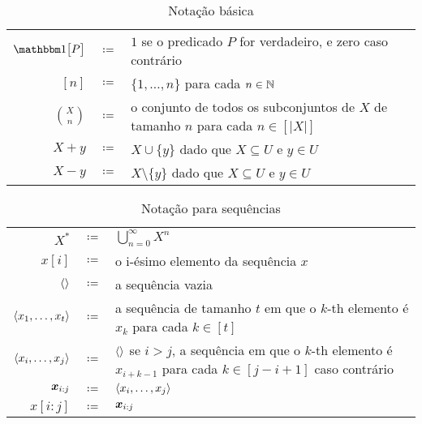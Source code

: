 \bgroup
	\renewcommand{\arraystretch}{1.2}
	\begin{table}[htbp]
	  \caption{Notação básica}
          \label{tbl:notation}
	  \centering
	  \begin{tabular}{r c p{13cm}}
	    \toprule
            \(\ind{P}\) & \(\coloneqq\)& \(1\) se o predicado \(P\) for verdadeiro, e zero caso contrário \\
            \([n]\)
            & \(\coloneqq\)
            & \(\{1, \dotsc, n\}\) para cada \(n
              \in \mathbb{N}\)\\
            \(\binom{X}{n}\) & \(\coloneqq\)& o conjunto de todos os subconjuntos de \(X\) de tamanho \(n\) para cada \(n \in [|X|]\) \\
            \(X + y\) & \(\coloneqq\)& \(X \cup \{y\}\) dado que \(X\subseteq U\) e \(y \in U\) \\
            \(X - y\) & \(\coloneqq\)& \(X \setminus \{y\}\) dado que \(X\subseteq U\) e \(y \in U\)\\
            \bottomrule
	  \end{tabular}
	\end{table}
\egroup

\bgroup
	\renewcommand{\arraystretch}{1.2}
	\begin{table}[htbp]
	  \caption{Notação para sequências}
          \label{tbl:seq_notation}
	  \centering
	  \begin{tabular}{r c p{13cm}}
	    \toprule
            \(X^*\)
            &\(\coloneqq\)
            & \(\bigcup_{n = 0}^\infty X^n\)\\
            \(x[i]\)
            & \(\coloneqq\)
            & o i-ésimo elemento da sequência \(x\) \\
            \(\langle\rangle\)
            & \(\coloneqq\)
            & a sequência vazia\\
            \(\langle x_1, \dotsc, x_t\rangle\)
            & \(\coloneqq\)
            & a sequência de tamanho \(t\) em que o \(k\)-th
              elemento é \(x_k\) para cada \(k \in [t]\) \\
            \(\langle x_i, \dotsc, x_j\rangle\)
            & \(\coloneqq\)
            & \(\langle\rangle\) se \(i > j\), a sequência em que o \(k\)-th elemento
              é \(x_{i + k -1}\) para cada \(k \in [j - i + 1]\)
              caso contrário\\
            \(\bm{x}_{i:j}\)
            & \(\coloneqq\)
            & \(\langle x_i, \dotsc, x_j\rangle\)\\
            \(x[i:j]\)
            & \(\coloneqq\)
            & \(\bm{x}_{i:j}\) \\
            \bottomrule
	  \end{tabular}
	\end{table}
\egroup


